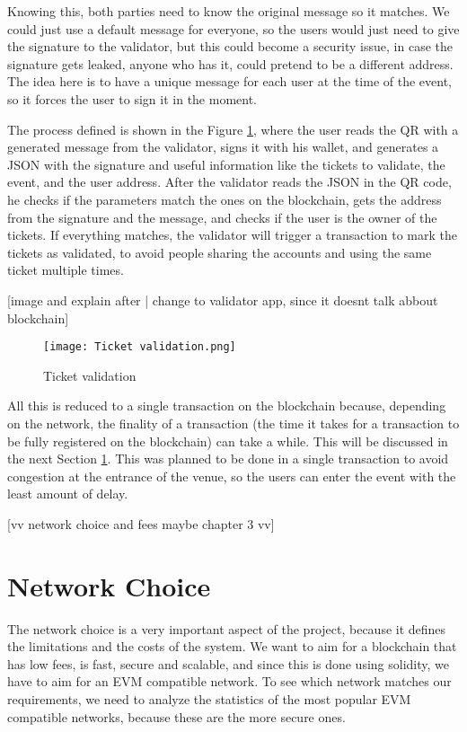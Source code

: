Knowing this, both parties need to know the original message so it matches. We
could just use a default message for everyone, so the users would just need to
give the signature to the validator, but this could become a security issue, in
case the signature gets leaked, anyone who has it, could pretend to be a
different address. The idea here is to have a unique message for each user at
the time of the event, so it forces the user to sign it in the moment.

The process defined is shown in the Figure \ref{fig:ticket_validation}, where
the user reads the QR with a generated message from the validator, signs it
with his wallet, and generates a JSON with the signature and useful information
like the tickets to validate, the event, and the user address. After the
validator reads the JSON in the QR code, he checks if the parameters match the
ones on the blockchain, gets the address from the signature and the message,
and checks if the user is the owner of the tickets. If everything matches, the
validator will trigger a transaction to mark the tickets as validated, to avoid
people sharing the accounts and using the same ticket multiple times.

	[image and explain after | change to validator app, since it doesnt talk abbout blockchain]

\begin{figure}[H]
	\texttt{[image: Ticket validation.png]}
	\centering
	\caption{Ticket validation}
	\label{fig:ticket_validation}
\end{figure}

All this is reduced to a single transaction on the blockchain because,
depending on the network, the finality of a transaction (the time it takes for
a transaction to be fully registered on the blockchain) can take a while. This
will be discussed in the next Section \ref{sec:network_choice}. This was
planned to be done in a single transaction to avoid congestion at the entrance
of the venue, so the users can enter the event with the least amount of delay.

	[vv network choice and fees maybe chapter 3 vv]

\section{Network Choice}
\label{sec:network_choice}

The network choice is a very important aspect of the project, because it
defines the limitations and the costs of the system. We want to aim for a
blockchain that has low fees, is fast, secure and scalable, and since this is
done using solidity, we have to aim for an EVM compatible network. To see which
network matches our requirements, we need to analyze the statistics of the most
popular EVM compatible networks, because these are the more secure ones.

